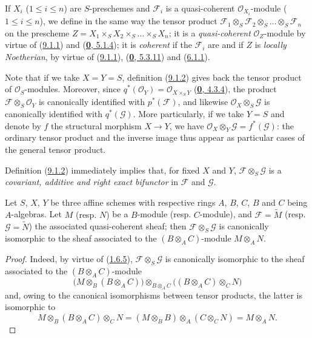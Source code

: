 If $X_i$ ($1\leq i\leq n$) are $S$-preschemes and $\mathscr{F}_i$ is a
quasi-coherent $\mathscr{O}_{X_i}$-module ($1\leq i\leq n$), we define in
the same way the tensor product
$\mathscr{F}_1\otimes_S\mathscr{F}_2\otimes_S\ldots\otimes_S\mathscr{F}_n$
on the prescheme
$Z=X_1\times_S X_2\times_S\ldots\times_S X_n$; it is a
\emph{quasi-coherent} $\mathscr{O}_Z$-module by virtue of
(\hyperref[I.9.1.1]{9.1.1}) and
(\hyperref[0.5.1.4]{\textbf{0}, 5.1.4}); it is \emph{coherent} if the
$\mathscr{F}_i$ are and if $Z$ is \emph{locally Noetherian}, by virtue
of (\hyperref[I.9.1.1]{9.1.1}),
(\hyperref[0.5.3.11]{\textbf{0}, 5.3.11}) and
(\hyperref[I.6.1.1]{6.1.1}).

Note that if we take $X=Y=S$, definition
(\hyperref[I.9.1.2]{9.1.2}) gives back the tensor product of
$\mathscr{O}_S$-modules. Moreover, since
$q^*(\mathscr{O}_Y)=\mathscr{O}_{X\times_S Y}$
(\hyperref[0.4.3.4]{\textbf{0}, 4.3.4}), the product
$\mathscr{F}\otimes_S\mathscr{O}_Y$ is canonically identified with
$p^*(\mathscr{F})$, and likewise
$\mathscr{O}_X\otimes_S\mathscr{G}$ is canonically identified with
$q^*(\mathscr{G})$. More particularly, if we take $Y=S$ and denote by $f$
the structural morphism $X\to Y$, we have
$\mathscr{O}_X\otimes_Y\mathscr{G}=f^*(\mathscr{G})$: the ordinary tensor
product and the inverse image thus appear as particular cases of the
general tensor product.

Definition (\hyperref[I.9.1.2]{9.1.2}) immediately implies that, for
fixed $X$ and $Y$, $\mathscr{F}\otimes_S\mathscr{G}$ is a
\emph{covariant, additive and right exact bifunctor} in $\mathscr{F}$ and
$\mathscr{G}$.

\begin{proposition}[9.1.3]
\label{I.9.1.3}
Let $S$, $X$, $Y$ be three affine schemes with respective rings $A$, $B$,
$C$, $B$ and $C$ being $A$-algebras. Let $M$ \textup{(resp. $N$)} be a $B$-module
\textup{(resp.} $C$-module), and $\mathscr{F}=\widetilde{M}$ \textup{(resp.}
$\mathscr{G}=\widetilde{N}$) the associated quasi-coherent sheaf; then
$\mathscr{F}\otimes_S\mathscr{G}$ is canonically isomorphic to the sheaf
associated to the $(B\otimes_A C)$-module $M\otimes_A N$.
\end{proposition}

\begin{proof}
Indeed, by virtue of (\hyperref[I.1.6.5]{1.6.5}),
$\mathscr{F}\otimes_S\mathscr{G}$ is canonically isomorphic to the sheaf
associated to the $(B\otimes_A C)$-module
\[
  \bigl(M\otimes_B(B\otimes_A C)\bigr)
  \otimes_{B\otimes_A C}
  \bigl((B\otimes_A C)\otimes_C N\bigr)
\]
and, owing to the canonical isomorphisms between tensor products, the
latter is isomorphic to
\[
  M\otimes_B(B\otimes_A C)\otimes_C N
  =(M\otimes_B B)\otimes_A(C\otimes_C N)=M\otimes_A N.
\]
\end{proof}


